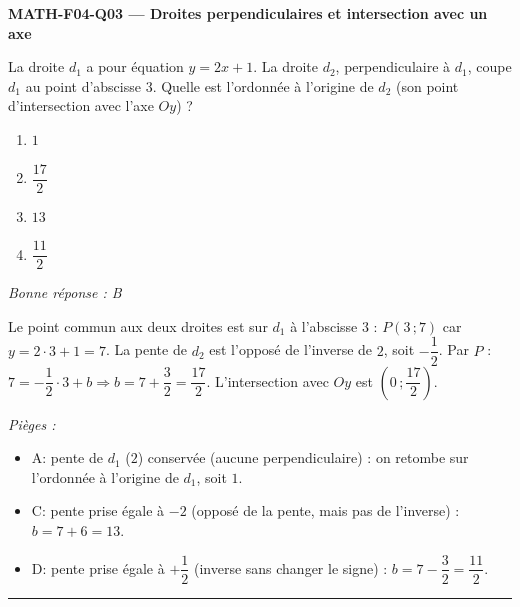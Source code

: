 \documentclass[11pt,a4paper]{article}
\begin{document}
\noindent\textbf{MATH-F04-Q03 --- Droites perpendiculaires et intersection avec un axe}\par
La droite $d_1$ a pour équation $y=2x+1$. La droite $d_2$, perpendiculaire à $d_1$, coupe $d_1$ au point d'abscisse $3$. Quelle est l'ordonnée à l'origine de $d_2$ (son point d'intersection avec l'axe $Oy$) ?
\begin{enumerate}[label=\Alph*)]
\item $1$
\item $\dfrac{17}{2}$
\item $13$
\item $\dfrac{11}{2}$
\end{enumerate}
\textit{Bonne réponse : B}\par
Le point commun aux deux droites est sur $d_1$ à l'abscisse $3$ : $P(3\,;7)$ car $y=2\cdot 3+1=7$. La pente de $d_2$ est l'opposé de l'inverse de $2$, soit $-\dfrac{1}{2}$. Par $P$ : $7=-\dfrac{1}{2}\cdot 3+b\Rightarrow b=7+\dfrac{3}{2}=\dfrac{17}{2}$. L'intersection avec $Oy$ est $\left(0\,;\dfrac{17}{2}\right)$.\par
\textit{Pièges :}
\begin{itemize}
\item A: pente de $d_1$ ($2$) conservée (aucune perpendiculaire) : on retombe sur l'ordonnée à l'origine de $d_1$, soit $1$.
\item C: pente prise égale à $-2$ (opposé de la pente, mais pas de l'inverse) : $b=7+6=13$.
\item D: pente prise égale à $+\dfrac{1}{2}$ (inverse sans changer le signe) : $b=7-\dfrac{3}{2}=\dfrac{11}{2}$.
\end{itemize}
\vspace{8pt}\hrule\vspace{8pt}
\end{document}
